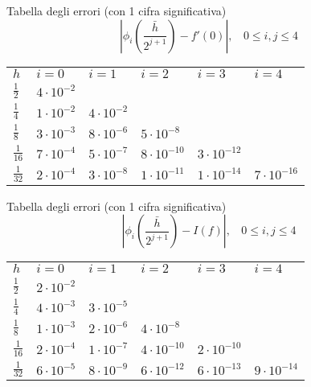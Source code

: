 Tabella degli errori (con 1 cifra significativa)
\begin{equation*}
    |\phi_i(\frac{\bar{h}}{2^{j+1}})-f'(0)|,\  \  \  \ 0\leq i,j\leq4
\end{equation*}

\begin{table}[H]
\centering
\begin{tabular}{llllll}
$h$ & $i=0$ & $i=1$ & $i=2$ & $i=3$ & $i=4$ \\  \cline{1-6} 

$\frac{1}{2}$ & $4\cdot10^{-2}$ \\ 

$\frac{1}{4}$ & $1\cdot10^{-2}$ & $4\cdot10^{-2}$  \\

$\frac{1}{8}$ & $3\cdot10^{-3}$ & $8\cdot10^{-6}$ & $5\cdot10^{-8}$ \\

$\frac{1}{16}$ & $7\cdot10^{-4}$ & $5\cdot10^{-7}$ & $8\cdot10^{-10}$ & $3\cdot10^{-12}$  \\

$\frac{1}{32}$ & $2\cdot10^{-4}$ & $3\cdot10^{-8}$ & $1\cdot10^{-11}$ & $1\cdot10^{-14}$ & $7\cdot10^{-16}$ \\

\end{tabular}
\end{table}

Tabella degli errori (con 1 cifra significativa)
\begin{equation*}
    |\phi_i(\frac{\bar{h}}{2^{j+1}})-I(f)|,\  \  \  \ 0\leq i,j\leq4
\end{equation*}
\begin{table}[H]
\centering
\begin{tabular}{llllll}
$h$ & $i=0$ & $i=1$ & $i=2$ & $i=3$ & $i=4$ \\  \cline{1-6} 

$\frac{1}{2}$ & $2\cdot10^{-2}$ \\ 

$\frac{1}{4}$ & $4\cdot10^{-3}$ & $3\cdot10^{-5}$  \\

$\frac{1}{8}$ & $1\cdot10^{-3}$ & $2\cdot10^{-6}$ & $4\cdot10^{-8}$ \\

$\frac{1}{16}$ & $2\cdot10^{-4}$ & $1\cdot10^{-7}$ & $4\cdot10^{-10}$ & $2\cdot10^{-10}$  \\

$\frac{1}{32}$ & $6\cdot10^{-5}$ & $8\cdot10^{-9}$ & $6\cdot10^{-12}$ & $6\cdot10^{-13}$ & $9\cdot10^{-14}$ \\

\end{tabular}
\end{table}

